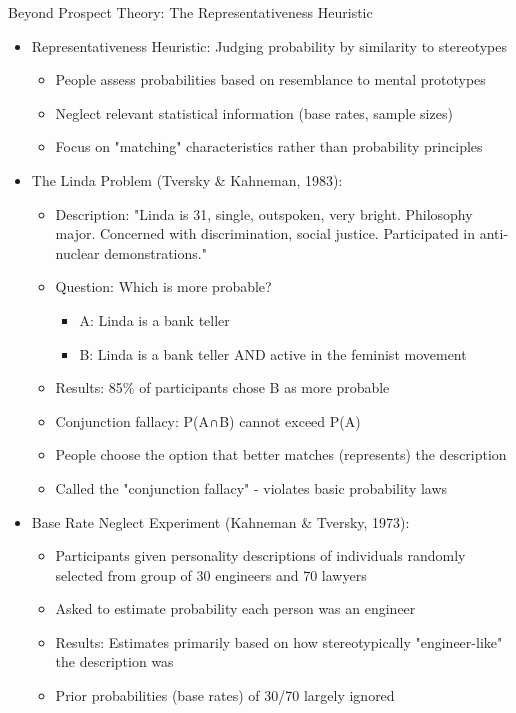 \documentclass[10pt]{beamer}
\begin{document}
\begin{frame}{Beyond Prospect Theory: The Representativeness Heuristic}
  \begin{itemize}[<+->]
    \item Representativeness Heuristic: Judging probability by similarity to stereotypes
      \begin{itemize}
        \item People assess probabilities based on resemblance to mental prototypes
        \item Neglect relevant statistical information (base rates, sample sizes)
        \item Focus on "matching" characteristics rather than probability principles
      \end{itemize}
    \item The Linda Problem (Tversky \& Kahneman, 1983):
      \begin{itemize}
        \item Description: "Linda is 31, single, outspoken, very bright. Philosophy major. Concerned with discrimination, social justice. Participated in anti-nuclear demonstrations."
        \item Question: Which is more probable?
          \begin{itemize}
            \item A: Linda is a bank teller
            \item B: Linda is a bank teller AND active in the feminist movement
          \end{itemize}
        \item Results: 85\% of participants chose B as more probable
        \item Conjunction fallacy: P(A∩B) cannot exceed P(A)
        \item People choose the option that better matches (represents) the description
        \item Called the "conjunction fallacy" - violates basic probability laws
      \end{itemize}
    \item Base Rate Neglect Experiment (Kahneman \& Tversky, 1973):
      \begin{itemize}
        \item Participants given personality descriptions of individuals randomly selected from group of 30 engineers and 70 lawyers
        \item Asked to estimate probability each person was an engineer
        \item Results: Estimates primarily based on how stereotypically "engineer-like" the description was
        \item Prior probabilities (base rates) of 30/70 largely ignored
      \end{itemize}
  \end{itemize}
\end{frame}
\end{document}
